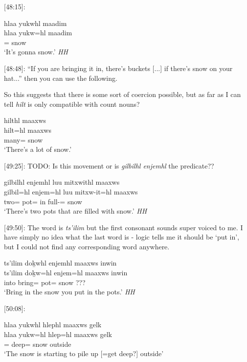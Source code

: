 [48:15]:

\begin{exe}
    \ex \glll hlaa yukwhl maadim  \\
    hlaa yukw=hl maadim   \\
    \Incep{} \Prog{}=\Cn{} snow  \\
    `It's gonna snow.' \textit{HH}
\end{exe}

[48:48]: ``If you are bringing it in, there's buckets [...] if there's snow on your hat...'' then you can use the following. 

So this suggests that there is some sort of coercion possible, but as far as I can tell \textit{hilt} is only compatible with count nouns? 

\begin{exe}
    \ex \glll hilthl maaxws \\
    hilt=hl maaxws   \\
    many=\Cn{} snow  \\
    `There's a lot of snow.'
\end{exe}

[49:25]: TODO: Is this movement or is \textit{gilbilhl enjemhl} the predicate??

\begin{exe}
    \ex \glll gilbilhl enjemhl luu mitxwithl maaxws \\
    gilbil=hl enjem=hl luu mitxw-it=hl maaxws   \\
    two=\Cn{} pot=\Cn{} in full-\Sx{}=\Cn{} snow  \\
    `There's two pots that are filled with snow.' \textit{HH}
\end{exe}

[49:50]: The word is \textit{ts'ilim} but the first consonant sounds super voiced to me. I have simply no idea what the last word is - logic tells me it should be `put in', but I could not find any corresponding word anywhere.

\begin{exe}
    \ex \glll ts'ilim doḵwhl enjemhl maaxws inwin \\
    ts'ilim doḵw=hl enjem=hl maaxws inwin    \\
    into bring=\Cn{} pot=\Cn{} snow ???   \\
    `Bring in the snow you put in the pots.' \textit{HH}
\end{exe}

[50:08]:

\begin{exe}
    \ex \glll hlaa yukwhl hlephl maaxws gelk \\
    hlaa yukw=hl hlep=hl maaxws gelk   \\
    \Incep{} \Prog{}=\Cn{} deep=\Cn{} snow outside \\
    `The snow is starting to pile up [=get deep?] outside' 
\end{exe}


